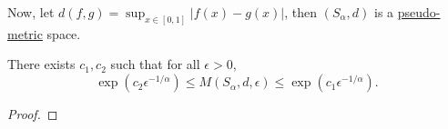 Now, let \(d(f, g) = \sup _{x\in [0, 1]} \vert f(x) - g(x) \vert \), then \((S_\alpha , d)\) is a \hyperref[def:pseudo-metric]{pseudo-metric} space.

\begin{theorem}
  There exists \(c_1, c_2\) such that for all \(\epsilon > 0\),
  \[
    \exp \left( c_2 \epsilon ^{-1 / \alpha } \right)
    \leq M(S_\alpha , d, \epsilon )
    \leq \exp \left( c_1 \epsilon ^{-1 / \alpha } \right) .
  \]
\end{theorem}
\begin{proof}

\end{proof}